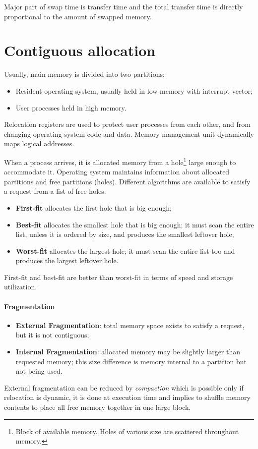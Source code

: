 Major part of swap time is transfer time and the total transfer time is directly proportional to the amount of swapped memory.

\section{Contiguous allocation}
Usually, main memory is divided into two partitions:

\begin{itemize}
\item Resident operating system, usually held in low memory with interrupt vector;
\item User processes held in high memory.
\end{itemize}
Relocation registers are used to protect user processes from each other, and from changing operating system code and data. Memory management unit dynamically maps logical addresses.

When a process arrives, it is allocated memory from a hole\footnote{Block of available memory. Holes of various size are scattered throughout memory.} large enough to accommodate it. Operating system maintains information about allocated partitions and free partitions (holes). Different algorithms are available to satisfy a request from a list of free holes.

\begin{itemize}
\item \textbf{First-fit} allocates the first hole that is big enough;
\item \textbf{Best-fit} allocates the smallest hole that is big enough; it must scan the entire list, unless it is ordered by size, and produces the smallest leftover hole;
\item \textbf{Worst-fit} allocates the largest hole; it must scan the entire list too and produces the largest leftover hole.
\end{itemize}
First-fit and best-fit are better than worst-fit in terms of speed and storage utilization.

\paragraph{Fragmentation}
\begin{itemize}
\item \textbf{External Fragmentation}: total memory space exists to satisfy a request, but it is not contiguous;
\item \textbf{Internal Fragmentation}: allocated memory may be slightly larger than requested memory; this size difference is memory internal to a partition but not being used.
\end{itemize}
External fragmentation can be reduced by \emph{compaction} which is possible only if relocation is dynamic, it is done at execution time and implies to shuffle memory contents to place all free memory together in one large block.

